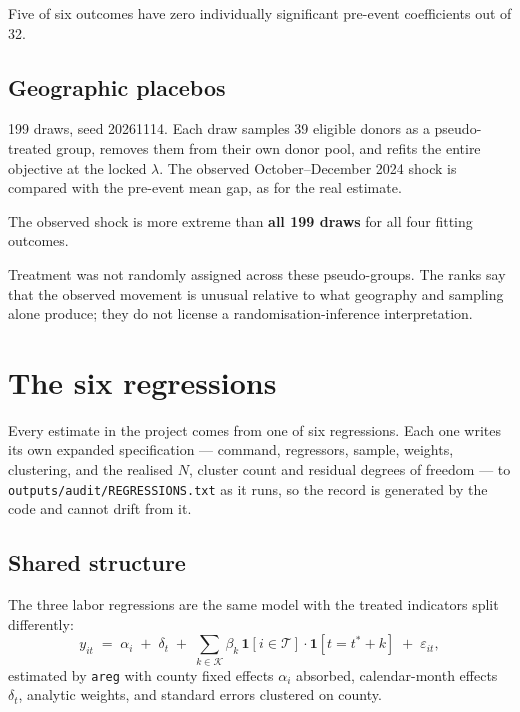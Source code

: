 \documentclass[11pt,a4paper]{article}
\newcommand{\caution}[2]{\begin{tcolorbox}[warnbox,title={#1}]#2\end{tcolorbox}}
\newcommand{\file}[1]{\texttt{\small #1}}
\begin{document}
\noindent Five of six outcomes have zero individually significant pre-event
coefficients out of 32.

\subsection{Geographic placebos}

199 draws, seed 20261114. Each draw samples 39 eligible donors as a
pseudo-treated group, removes them from their own donor pool, and refits the
entire objective at the locked $\lambda$. The observed October--December 2024
shock is compared with the pre-event mean gap, as for the real estimate.

The observed shock is more extreme than \textbf{all 199 draws} for all four
fitting outcomes.

\caution{These are benchmarking ranks, not randomisation p-values}{%
Treatment was not randomly assigned across these pseudo-groups. The ranks say
that the observed movement is unusual relative to what geography and sampling
alone produce; they do not license a randomisation-inference interpretation.}

\section{The six regressions}

Every estimate in the project comes from one of six regressions. Each one
writes its own expanded specification --- command, regressors, sample, weights,
clustering, and the realised $N$, cluster count and residual degrees of freedom
--- to \file{outputs/audit/REGRESSIONS.txt} as it runs, so the record is
generated by the code and cannot drift from it.

\subsection{Shared structure}

The three labor regressions are the same model with the treated indicators
split differently:
\[
y_{it} \;=\; \alpha_i \;+\; \delta_t \;+\; \sum_{k\in\mathcal{K}} \beta_k\,
\mathbf{1}[i\in\mathcal{T}]\cdot\mathbf{1}[t = t^\ast + k] \;+\; \varepsilon_{it},
\]
estimated by \texttt{areg} with county fixed effects $\alpha_i$ absorbed,
calendar-month effects $\delta_t$, analytic weights, and standard errors
clustered on county.
\end{document}
